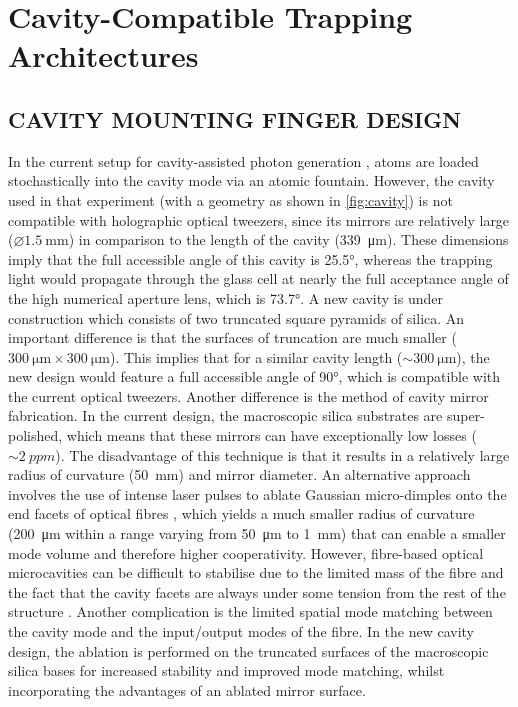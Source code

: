 \documentclass[../Thesis-IJspeert.tex]{subfiles}
\begin{document}
\graphicspath{ {"Cavity-Compatible Trapping Architectures/figs/"} }

\chapter{Cavity-Compatible Trapping Architectures}
\label{chap:CavityCompatibleTrappingArchitectures}

\section{CAVITY MOUNTING FINGER DESIGN}
In the current setup for cavity-assisted photon generation \cite{Barrett2019}, atoms are loaded stochastically into the cavity mode via an atomic fountain. However, the cavity used in that experiment (with a geometry as shown in \autoref{fig:cavity}) is not compatible with holographic optical tweezers, since its mirrors are relatively large ($\diameter \SI{1.5}{\milli\meter}$) in comparison to the length of the cavity (\SI{339}{\micro\meter}). These dimensions imply that the full accessible angle of this cavity is \ang{25.5}, whereas the trapping light would propagate through the glass cell at nearly the full acceptance angle of the high numerical aperture lens, which is \ang{73.7}. A new cavity is under construction which consists of two truncated square pyramids of silica. An important difference is that the surfaces of truncation are much smaller ($\SI{300}{\micro\meter}\times\SI{300}{\micro\meter}$). This implies that for a similar cavity length ($\sim\SI{300}{\micro\meter}$), the new design would feature a full accessible angle of \ang{90}, which is compatible with the current optical tweezers. Another difference is the method of cavity mirror fabrication. In the current design, the macroscopic silica substrates are super-polished, which means that these mirrors can have exceptionally low losses ($\sim\SI{2}{ppm}$). The disadvantage of this technique is that it results in a relatively large radius of curvature (\SI{50}{\milli\meter}) and mirror diameter. An alternative approach involves the use of intense  laser pulses to ablate Gaussian micro-dimples onto the end facets of optical fibres \cite{Hunger2010}, which yields a much smaller radius of curvature (\SI{200}{\micro\meter} within a range varying from \SI{50}{\micro\meter} to \SI{1}{\milli\meter}) that can enable a smaller mode volume and therefore higher cooperativity. However, fibre-based optical microcavities can be difficult to stabilise due to the limited mass of the fibre and the fact that the cavity facets are always under some tension from the rest of the structure \cite{Janitz2017}. Another complication is the limited spatial mode matching between the cavity mode and the input/output modes of the fibre. In the new cavity design, the ablation is performed on the truncated surfaces of the macroscopic silica bases for increased stability and improved mode matching, whilst incorporating the advantages of an ablated mirror surface.
\end{document}

